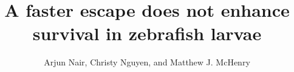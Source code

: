\documentclass[]{rsos}%
\begin{document}
\title{A faster escape does not enhance survival in zebrafish larvae}


\author{%
Arjun Nair, Christy Nguyen, and Matthew J. McHenry}

\address{Department of Ecology and Evolutionary Biology\\
University of California, Irvine\\
321 Steinhaus Hall\\
Irvine, CA 92697}

\subject{Animal behavior, biomechanics}






\maketitle




\linespread{1.6}\selectfont %
\end{document}
